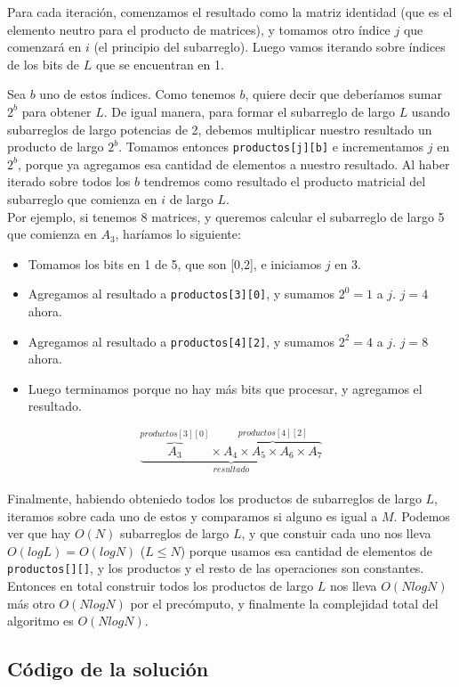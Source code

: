 Para cada iteración, comenzamos el resultado como la matriz identidad (que es el elemento neutro 
para el producto de matrices), y tomamos otro índice $j$ que comenzará en $i$ (el principio del subarreglo). 
Luego vamos iterando sobre índices de los bits de $L$ que se encuentran en 1. 


Sea $b$ uno de estos índices. 
Como tenemos $b$, quiere decir que deberíamos sumar $2^b$ para obtener $L$. De igual manera, para 
formar el subarreglo de largo $L$ usando subarreglos de largo potencias de 2, 
debemos multiplicar nuestro resultado un producto de largo $2^b$. Tomamos entonces \texttt{productos[j][b]} 
e incrementamos $j$ en $2^b$, porque ya agregamos esa cantidad de elementos a nuestro resultado. 
Al haber iterado sobre todos los $b$ tendremos como resultado el producto matricial del subarreglo que 
comienza en $i$ de largo $L$. \\

Por ejemplo, si tenemos 8 matrices, y queremos calcular el subarreglo de largo 5 que comienza en $A_3$, 
haríamos lo siguiente: 
\begin{itemize}
\item Tomamos los bits en 1 de 5, que son \textsc{[0,2]}, e iniciamos $j$ en 3.
\item Agregamos al resultado a \texttt{productos[3][0]}, y sumamos $2^0=1$ a $j$. $j=4$ ahora. 
\item Agregamos al resultado a \texttt{productos[4][2]}, y sumamos $2^2=4$ a $j$. $j=8$ ahora. 
\item Luego terminamos porque no hay más bits que procesar, y agregamos el resultado. 
\end{itemize}

$$\underset{resultado}{\underbrace{\overset{productos[3][0]}{\overbrace{A_3}} \times \overset{productos[4][2]}{\overbrace{A_4 \times A_5 \times A_6 \times A_7}}}}$$\\

Finalmente, habiendo obteniedo todos los productos de subarreglos de largo $L$, iteramos sobre cada 
uno de estos y comparamos si alguno es igual a $M$. Podemos ver que hay $O(N)$ subarreglos de largo $L$, 
y que constuir cada uno nos lleva $O(log L) = O(log N)$ ($L \leq N$) porque usamos esa cantidad de elementos de 
\texttt{productos[][]}, y los productos y el resto de las operaciones son constantes. Entonces 
en total construir todos los productos de largo $L$ nos lleva $O(N log N)$ más otro $O(N log N)$ 
por el precómputo, y finalmente la complejidad total del algoritmo es $O(N log N)$. 

\newpage
\subsection{Código de la solución}

